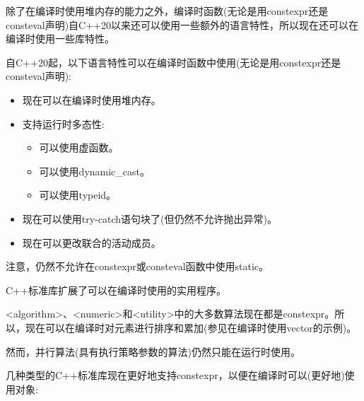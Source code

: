 
除了在编译时使用堆内存的能力之外，编译时函数(无论是用constexpr还是consteval声明)自C++20以来还可以使用一些额外的语言特性，所以现在还可以在编译时使用一些库特性。


自C++20起，以下语言特性可以在编译时函数中使用(无论是用constexpr还是consteval声明):

\begin{itemize}
\item 
现在可以在编译时使用堆内存。

\item 
支持运行时多态性:

\begin{itemize}
\item 
可以使用虚函数。

\item 
可以使用dynamic\_cast。

\item 
可以使用typeid。
\end{itemize}

\item
现在可以使用try-catch语句块了(但仍然不允许抛出异常)。

\item
现在可以更改联合的活动成员。
\end{itemize}

注意，仍然不允许在constexpr或consteval函数中使用static。


C++标准库扩展了可以在编译时使用的实用程序。


<algorithm>、<numeric>和<utility>中的大多数算法现在都是constexpr。所以，现在可以在编译时对元素进行排序和累加(参见在编译时使用vector的示例)。

然而，并行算法(具有执行策略参数的算法)仍然只能在运行时使用。


几种类型的C++标准库现在更好地支持constexpr，以便在编译时可以(更好地)使用对象:

